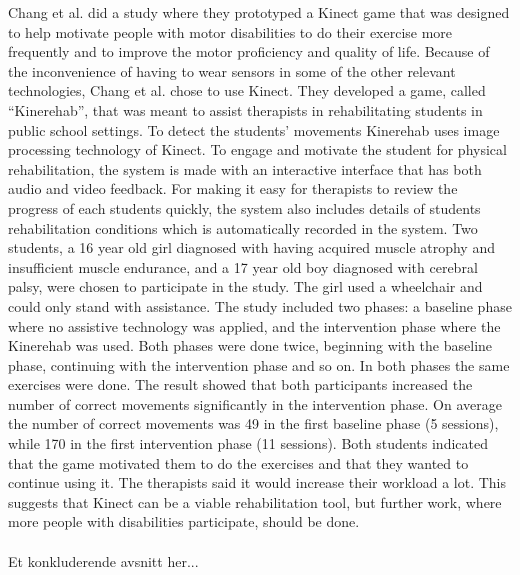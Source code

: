 Chang et al. did a study where they prototyped a Kinect game that was designed to help motivate people with motor disabilities to do their exercise more frequently and to improve the motor proficiency and quality of life. Because of the inconvenience of having to wear sensors in some of the other relevant technologies, Chang et al. chose to use Kinect. They developed a game, called “Kinerehab”, that was meant to assist therapists in rehabilitating students in public school settings. To detect the students’ movements Kinerehab uses image processing technology of Kinect. To engage and motivate the student for physical rehabilitation, the system is made with an interactive interface that has both audio and video feedback. For making it easy for therapists to review the progress of each students quickly, the system also includes details of students rehabilitation conditions which is automatically recorded in the system. Two students, a 16 year old girl diagnosed with having acquired muscle atrophy and insufficient muscle endurance, and a 17 year old boy diagnosed with cerebral palsy, were chosen to participate in the study. The girl used a wheelchair and could only stand with assistance. The study included two phases: a baseline phase  where no assistive technology was applied, and the intervention phase where the Kinerehab was used. Both phases were done twice, beginning with the baseline phase, continuing with the intervention phase and so on. In both phases the same exercises were done. The result showed that both participants increased the number of correct movements significantly in the intervention phase. On average the number of correct movements was 49 in the first baseline phase (5 sessions), while 170 in the first intervention phase (11 sessions). Both students indicated that the game motivated them to do the exercises and that they wanted to continue using it. The therapists said it would increase their workload a lot. This suggests that Kinect can be a viable rehabilitation tool, but further work, where more people with disabilities participate, should be done. \cite{kinect} \\ \\

Et konkluderende avsnitt her...





